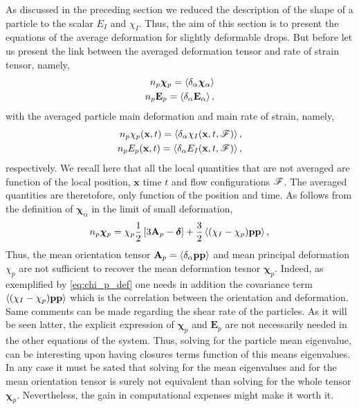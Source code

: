 As discussed in the preceding section we reduced the description of the shape of a particle to the scalar $E_I$ and $\chi_I$. 
Thus, the aim of this section is to present the equations of the average deformation for slightly deformable drops.     
But before let us present the link between the averaged deformation tensor and rate of strain tensor, namely, 
\begin{align*}
    n_p \bm\chi_p = \left<\delta_\alpha \bm\chi_\alpha\right>\\
    n_p \textbf{E}_p = \left<\delta_\alpha \textbf{E}_\alpha\right>,
\end{align*}
with the averaged particle main deformation and main rate of strain, namely, 
\begin{align*}
    n_p \chi_p(\textbf{x},t) = \left<\delta_\alpha \chi_I(\textbf{x},t,\mathscr{F})\right>,\\
    n_p E_p(\textbf{x},t) = \left<\delta_\alpha E_I(\textbf{x},t,\mathscr{F})\right>,
\end{align*}
respectively. 
We recall here that all the local quantities that are not averaged are function of the local position, $\textbf{x}$ time $t$ and flow configurations $\mathscr{F}$. 
The averaged quantities are theretofore, only function of the position and time. 
As follows from the definition of $\bm\chi_\alpha$ in the limit of small deformation, 
\begin{equation}
    n_p \bm\chi_p
    = \chi_p
    \frac{1}{2}\left[
        3\textbf{A}_p 
        - \bm\delta
    \right]
    + \frac{3}{2}\left<(\chi_I - \chi_p) \textbf{pp} \right>, 
    \label{eq:chi_p_def}
\end{equation}
Thus, the mean orientation tensor $\textbf{A}_p = \left<\delta_\alpha \textbf{pp}\right>$ and mean principal deformation $\chi_p$ are not sufficient to recover the mean deformation tesnor $\bm\chi_p$.
Indeed, as exemplified by \ref{eq:chi_p_def} one needs in addition the covariance term $\left<(\chi_I - \chi_p) \textbf{pp} \right>$ which is the correlation between the orientation and deformation. 
Same comments can be made regarding the shear rate of the particles. 
As it will be seen latter, the explicit expression of $\bm\chi_p$ and $\textbf{E}_p$ are not necessarily needed in the other equations of the system. 
Thus, solving for the particle mean eigenvalue, can be interesting upon having closures terms function of this means eigenvalues.
In any case it must be sated that solving for the mean eigenvalues and for the mean orientation tensor is surely not equivalent than solving for the whole tensor $\bm\chi_p$. 
Nevertheless, the gain in computational expenses might make it worth it. 

